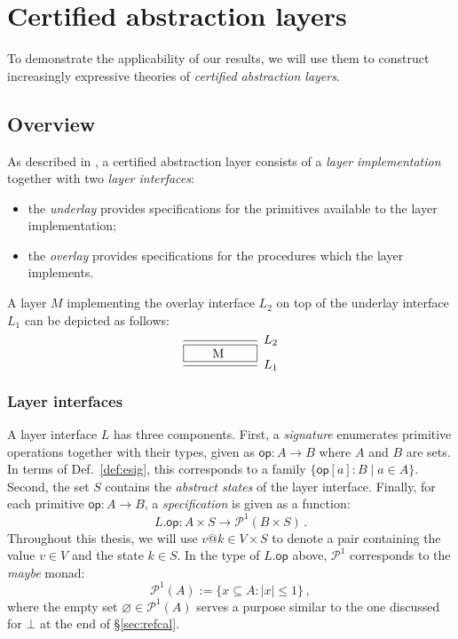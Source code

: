 \documentclass[draft,11pt]{report}
\newcommand{\kw}[1]{\ensuremath{ \mathsf{#1} }}
\begin{document}


\chapter{Certified abstraction layers} \label{sec:cal} %

To demonstrate the applicability of our results,
we will use them to construct
increasingly expressive theories of
\emph{certified abstraction layers}.

\section{Overview} %

As described in \citet{popl15},
a certified abstraction layer
consists of a \emph{layer implementation} together with
two \emph{layer interfaces}:
\begin{itemize}
\item
the \emph{underlay} provides specifications for
the primitives available to the layer implementation;
\item
the \emph{overlay} provides specifications for
the procedures which the layer implements.
\end{itemize}
A layer $M$ implementing the overlay interface $L_2$
on top of the underlay interface $L_1$ can be depicted as follows:
\[
  \begin{prooftree}
    \infer0[$L_2$]{\fbox{\qquad M \qquad}}
    \infer1[$L_1$]{}
  \end{prooftree}
\]

\subsection{Layer interfaces}

A layer interface $L$ has three components.
First, a \emph{signature} enumerates
primitive operations together with their types,
given as $\kw{op} : A \rightarrow B$
where $A$ and $B$ are sets.
In terms of Def.~\ref{def:esig},
this corresponds to a family $\{ \kw{op}[a] : B \mid a \in A \}$.
Second,
the set $S$ contains the \emph{abstract states} of the layer interface.
Finally, for each primitive
$\kw{op} : A \rightarrow B$,
a \emph{specification}
is given as a function:
\[
  L.\kw{op} : A \times S \rightarrow \mathcal{P}^1(B \times S) \,.
\]
Throughout this thesis,
we will use $v@k \in V \times S$ to denote a pair
containing the value $v \in V$ and the state $k \in S$.
In the type of $L.\kw{op}$ above,
$\mathcal{P}^1$ corresponds to the \emph{maybe} monad:
\[
  \mathcal{P}^1(A) := \{ x \subseteq A : |x| \le 1 \} \,,
\]
where the empty set $\varnothing \in \mathcal{P}^1(A)$
serves a purpose similar to the one discussed for $\bot$
at the end of \S\ref{sec:refcal}.
\end{document}
